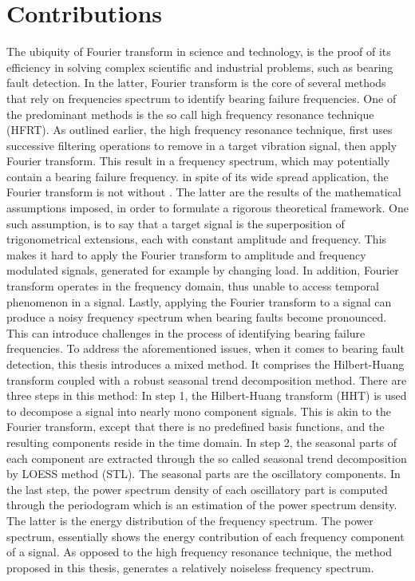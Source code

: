 \documentclass[../Main/thesis.tex]{subfiles}
\begin{document}
\section{Contributions }
\label{sec:contributions}
The ubiquity of Fourier transform in science and technology, is the proof of its efficiency in solving complex scientific and industrial problems, such as bearing fault detection. In the latter, Fourier transform is the core of several methods that rely on frequencies spectrum to identify bearing failure frequencies. One of the predominant methods is the so call high frequency resonance technique (HFRT). As outlined earlier, the high frequency resonance technique, first uses successive filtering operations to remove  in a target vibration signal, then apply Fourier transform. This result in a frequency spectrum, which may potentially contain a bearing failure frequency.
\justify
in spite of its wide spread application, the Fourier transform is not without . The latter are the results of the mathematical assumptions imposed, in order to formulate a rigorous theoretical framework. One such assumption, is to say that a target signal is the superposition of trigonometrical extensions, each with constant amplitude and frequency.
This makes it hard to apply the Fourier transform to amplitude and frequency modulated signals, generated for example by changing load. In addition, Fourier transform operates in the frequency domain, thus unable to access temporal phenomenon in a signal. Lastly, applying the Fourier transform to a signal can produce a noisy frequency spectrum when bearing faults become pronounced. This can introduce challenges in the process of identifying bearing failure frequencies.  
\justify
To address the aforementioned issues, when it comes to bearing fault detection, this thesis introduces a mixed method. It comprises the Hilbert-Huang transform coupled with a robust seasonal trend decomposition method. There are three steps in this method: In step 1, the Hilbert-Huang transform (HHT) is used to decompose a signal into nearly mono component signals. This is akin to the Fourier transform, except that there is no predefined basis functions, and the resulting components reside in the time domain. In step 2, the seasonal parts of each component are extracted through the so called seasonal trend decomposition by LOESS method (STL). The seasonal parts are the oscillatory components. In the last step, the power spectrum density of each oscillatory part is computed through the periodogram which is an estimation of the power spectrum density. The latter is the energy distribution of the frequency spectrum. The power spectrum, essentially shows the energy contribution of each frequency component of a signal.
\justify
As opposed to the high frequency resonance technique, the method proposed in this thesis, generates a relatively noiseless frequency spectrum.


\blankpage
\end{document}
